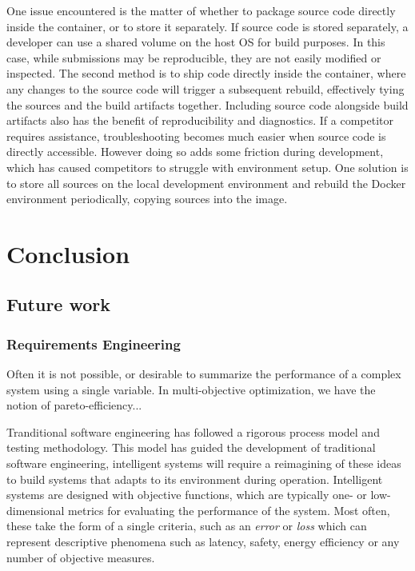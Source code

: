 \documentclass[12pt,initial,twoside,maitrise]{dms}
\numberwithin{equation}{section}
\numberwithin{table}{chapter}
\numberwithin{figure}{chapter}
\begin{document}
One issue encountered is the matter of whether to package source code directly inside the container, or to store it separately. If source code is stored separately, a developer can use a shared volume on the host OS for build purposes. In this case, while submissions may be reproducible, they are not easily modified or inspected. The second method is to ship code directly inside the container, where any changes to the source code will trigger a subsequent rebuild, effectively tying the sources and the build artifacts together. Including source code alongside build artifacts also has the benefit of reproducibility and diagnostics. If a competitor requires assistance, troubleshooting becomes much easier when source code is directly accessible. However doing so adds some friction during development, which has caused competitors to struggle with environment setup. One solution is to store all sources on the local development environment and rebuild the Docker environment periodically, copying sources into the image.

\chapter{Conclusion}\label{ch:conclusion}

\section{Future work}

\subsection{Requirements Engineering}

Often it is not possible, or desirable to summarize the performance of a complex system using a single variable. In multi-objective optimization, we have the notion of pareto-efficiency...

Tranditional software engineering has followed a rigorous process model and testing methodology. This model has guided the development of traditional software engineering, intelligent systems will require a reimagining of these ideas to build systems that adapts to its environment during operation. Intelligent systems are designed with objective functions, which are typically one- or low-dimensional metrics for evaluating the performance of the system. Most often, these take the form of a single criteria, such as an \textit{error} or \textit{loss} which can represent descriptive phenomena such as latency, safety, energy efficiency or any number of objective measures.
\end{document}
